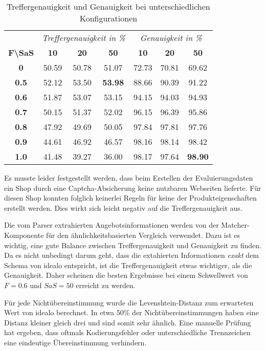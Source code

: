 \begin{table}[h]
    \centering
    \begin{tabular}{ c | c c c | c c c }
        &   \multicolumn{3}{c}{\textit{Treffergenauigkeit in \%}}    &   \multicolumn{3}{c}{\textit{Genauigkeit in \%}} \\
        \textbf{F\textbackslash SaS} & \textbf{10} & \textbf{20} & \textbf{50} & \textbf{10} & \textbf{20} & \textbf{50}  \\
        \hline
        \textbf{0}       &   50.59 &   50.78 &   51.07         &   72.73 &   70.81 &   69.62 \\
        \textbf{0.5}     &   52.12 &   53.50 &   \textbf{53.98}&   88.66 &   90.39 &   91.22 \\
        \textbf{0.6}     &   51.87 &   53.07 &   53.15         &   94.15 &   94.03 &   94.93 \\
        \textbf{0.7}     &   50.15 &   51.37 &   52.02         &   96.15 &   96.39 &   95.86 \\
        \textbf{0.8}     &   47.92 &   49.69 &   50.05         &   97.84 &   97.81 &   97.76 \\
        \textbf{0.9}     &   44.61 &   46.92 &   46.57         &   98.16 &   98.14 &   98.42 \\
        \textbf{1.0}     &   41.48 &   39.27 &   36.00         &   98.17 &   97.64 &   \textbf{98.90}

    \end{tabular}
    \caption{Treffergenauigkeit und Genauigkeit bei unterschiedlichen Konfigurationen}
    \label{tab:accuracy-precision}
\end{table}

Es musste leider festgestellt werden, dass beim Erstellen der Evaluierungsdaten ein Shop durch eine
Captcha-Absicherung keine nutzbaren Webseiten lieferte.
Für diesen Shop konnten folglich keinerlei Regeln für keine der Produkteigenschaften erstellt werden.
Dies wirkt sich leicht negativ auf die Treffergenauigkeit aus.

Die vom Parser extrahierten Angebotsinformationen werden von der Matcher-Komponente für den ähnlichkeitsbasierten
Vergleich verwendet.
Dazu ist es wichtig, eine gute Balance zwischen Treffergenauigkeit und Genauigkeit zu finden.
Da es nicht unbedingt darum geht, dass die extahierten Informationen \textit{exakt} dem Schema von idealo entspricht,
ist die Treffergenauigkeit etwas wichtiger, als die Genauigkeit.
Daher scheinen die besten Ergebnisse bei einem Schwellwert von $F=0.6$ und $SaS=50$ erreicht zu werden.

Für jede Nichtübereinstimmung wurde die Levenshtein-Distanz zum erwarteten Wert von idealo berechnet.
In etwa 50\% der Nichtübereinstimmungen haben eine Distanz kleiner gleich drei und sind somit sehr ähnlich.
Eine manuelle Prüfung hat ergeben, dass oftmals Kodierungsfehler oder unterschiedliche Trennzeichen eine eindeutige
Übereinstimmung verhindern.

